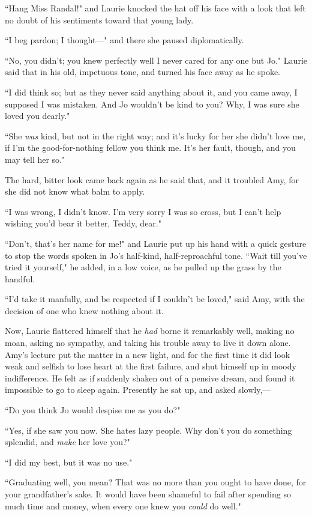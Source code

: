 ``Hang Miss Randal!" and Laurie knocked the hat off his face with a look
that left no doubt of his sentiments toward that young lady.

``I beg pardon; I thought---" and there she paused diplomatically.

``No, you didn't; you knew perfectly well I never cared
for any one but Jo." Laurie said that in his old, impetuous tone, and
turned his face away as he spoke.

``I did think so; but as they never said anything about it, and you came
away, I supposed I was mistaken. And Jo wouldn't be kind
to you? Why, I was sure she loved you dearly."

``She \emph{was} kind, but not in the right way; and it's
lucky for her she didn't love me, if I'm
the good-for-nothing fellow you think me. It's her
fault, though, and you may tell her so."

The hard, bitter look came back again as he said that, and it troubled
Amy, for she did not know what balm to apply.

``I was wrong, I didn't know. I'm very
sorry I was so cross, but I can't help wishing
you'd bear it better, Teddy, dear."

``Don't, that's her name for me!" and
Laurie put up his hand with a quick gesture to stop the words spoken in
Jo's half-kind, half-reproachful tone. ``Wait till
you've tried it yourself," he added, in a low voice, as
he pulled up the grass by the handful.

``I'd take it manfully, and be respected if I
couldn't be loved," said Amy, with the decision of one
who knew nothing about it.

Now, Laurie flattered himself that he \emph{had} borne it remarkably
well, making no moan, asking no sympathy, and taking his trouble away to
live it down alone. Amy's lecture put the matter in a
new light, and for the first time it did look weak and selfish to lose
heart at the first failure, and shut himself up in moody indifference.
He felt as if suddenly shaken out of a pensive dream, and found it
impossible to go to sleep again. Presently he sat up, and asked
slowly,---

``Do you think Jo would despise me as you do?"

``Yes, if she saw you now. She hates lazy people. Why
don't you do something splendid, and \emph{make} her
love you?"

``I did my best, but it was no use."

``Graduating well, you mean? That was no more than you ought to have
done, for your grandfather's sake. It would have been
shameful to fail after spending so much time and money, when every one
knew you \emph{could} do well."

